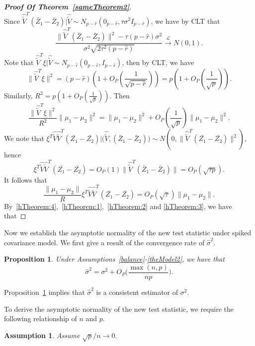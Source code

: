 \documentclass[review]{elsarticle}
\theoremstyle{plain}
\newtheorem{proposition}{\quad\quad Proposition}
\newtheorem{assumption}{\quad\quad Assumption}
\theoremstyle{definition}
\theoremstyle{remark}
\begin{document}
\begin{proof}[\textbf{Proof Of Theorem~\ref{sameTheorem2}}]
\begin{equation}
\end{equation}
    Since $\hat{\tilde{V}}^T(\bar{Z}_1-\bar{Z}_2)|\hat{\tilde{V}}\sim N_{p-\hat{r}}(0_{p-\hat{r}},\tau\sigma^2 I_{p-\hat{r}})$, we have by CLT that
    \begin{equation}\label{hTheorem:1}
    \frac{\|\hat{\tilde{V}}^T(\bar{Z}_1-\bar{Z}_2)\|^2-\tau(p-\hat{r})\sigma^2}{\sigma^2\sqrt{2\tau^2(p-\hat{r})}}\xrightarrow{\mathcal{L}}N(0,1).
    \end{equation}
    Note that $\hat{\tilde{V}}^T\xi|\hat{\tilde{V}}\sim N_{p-\hat{r}}(0_{p-\hat{r}},I_{p-\hat{r}})$, then by CLT, we have 
    $$\|\hat{\tilde{V}}^T\xi\|^2=(p-\hat{r})(1+O_P(\frac{1}{\sqrt{p-\hat{r}}}))=p(1+O_P(\frac{1}{\sqrt{p}})).$$
    Similarly, $R^2=p(1+O_P(\frac{1}{\sqrt{p}}))$.
    Then
    \begin{equation}\label{hTheorem:2}
    \frac{\|\hat{\tilde{V}}^T\xi\|^2}{R^2}\|\mu_1-\mu_2\|^2=\|\mu_1-\mu_2\|^2+O_P(\frac{1}{\sqrt{p}})\|\mu_1-\mu_2\|^2.
    \end{equation}
    We note that $\xi^T\hat{\tilde{V}}\hat{\tilde{V}}^T(\bar{Z_1}-\bar{Z_2})\big|\big(\hat{\tilde{V}},(\bar{Z}_1-\bar{Z}_2)\big)\sim N(0,\|\hat{\tilde{V}}^T(\bar{Z_1}-\bar{Z_2})\|^2)$, hence
    $$
    \xi^T\hat{\tilde{V}}\hat{\tilde{V}}^T(\bar{Z_1}-\bar{Z_2})
    =O_P(1)\|\hat{\tilde{V}}^T(\bar{Z}_1-\bar{Z}_2)\|=O_P(\sqrt{\tau p}).
    $$
    It follows that
    \begin{equation}\label{hTheorem:3}
    \frac{\|\mu_1-\mu_2\|}{R}\xi^T\hat{\tilde{V}}\hat{\tilde{V}}^T(\bar{Z_1}-\bar{Z_2})=O_P(\sqrt{\tau})\|\mu_1-\mu_2\|.
    \end{equation}
    By~\eqref{hTheorem:4},~\eqref{hTheorem:1},~\eqref{hTheorem:2} and \eqref{hTheorem:3}, we have that

\end{proof}

Now we establish the asymptotic normality of the new test statistic under spiked covariance model.
We first give a result of the convergence rate of $\hat{\sigma}^2$.
\begin{proposition}\label{varianceEstimation}
    Under Assumptions~\ref{balance}-\ref{theModel2}, we have that%
    $$
    \hat{\sigma}^2=\sigma^2 + O_P\Big(\frac{\max (n,p)}{np}\Big).
    $$
\end{proposition}
Proposition~\ref{varianceEstimation} implies that $\hat{\sigma}^2$ is a consistent estimator of $\sigma^2$.   

To derive the asymptotic normality of the new test statistic, we require the following relationship of $n$ and $p$.
\begin{assumption}\label{pAndN}
    Assume
    $
    {\sqrt{p}}/{n}\to 0.
    $
\end{assumption}
\end{document}
